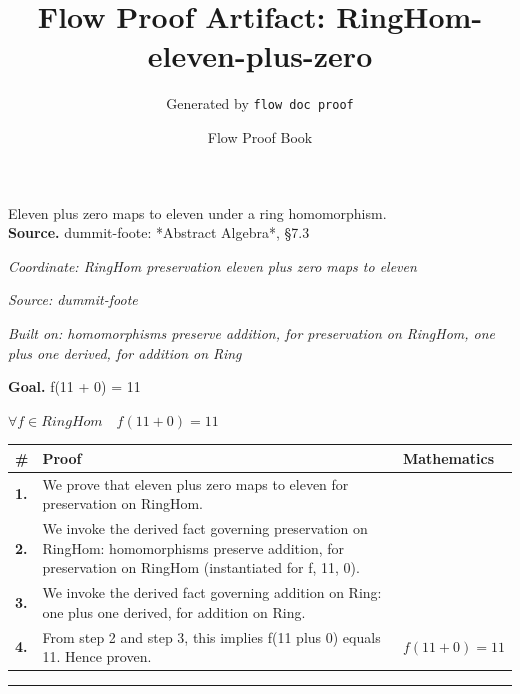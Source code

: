 \documentclass[11pt]{article}
\title{Flow Proof Artifact: RingHom-eleven-plus-zero}
\author{Generated by \texttt{flow doc proof}}
\date{Flow Proof Book}
\theoremstyle{definition}
\begin{document}
\maketitle
Eleven plus zero maps to eleven under a ring homomorphism.\\[0.5em]
\textbf{Source.} dummit-foote: *Abstract Algebra*, §7.3\\[0.5em]
\bigskip
{}\par
\smallskip\noindent\textit{Coordinate: RingHom \cdot preservation \cdot eleven plus zero maps to eleven}\par
\smallskip\noindent\textit{Source: dummit-foote}\par
\smallskip\noindent\textit{Built on: homomorphisms preserve addition, for preservation on RingHom, one plus one derived, for addition on Ring}\par
\medskip
\noindent\textbf{Goal.} f(11 + 0) = 11\par
\noindent$\displaystyle \forall f \in RingHom\quad f(11 + 0) = 11$\par
\medskip
\noindent
\begin{tabular}{@{} >{\raggedright\arraybackslash}p{} >{\raggedright\arraybackslash}p{} >{\raggedleft\arraybackslash}p{} @{}}
\textbf{\#} & \textbf{Proof} & \textbf{Mathematics} \\
\midrule
\textbf{1.} & We prove that eleven plus zero maps to eleven for preservation on RingHom. & \\[0.45em]
\textbf{2.} & We invoke the derived fact governing preservation on RingHom: homomorphisms preserve addition, for preservation on RingHom (instantiated for f, 11, 0). & \\[0.45em]
\textbf{3.} & We invoke the derived fact governing addition on Ring: one plus one derived, for addition on Ring. & \\[0.45em]
\textbf{4.} & From step 2 and step 3, this implies f(11 plus 0) equals 11. Hence proven. & $\displaystyle f(11 + 0) = 11$ \\[0.45em]
\bottomrule
\end{tabular}
\label{thm:RingHom-preservation-eleven_plus_zero_maps_to_eleven}
\par\medskip\hrule
\end{document}
